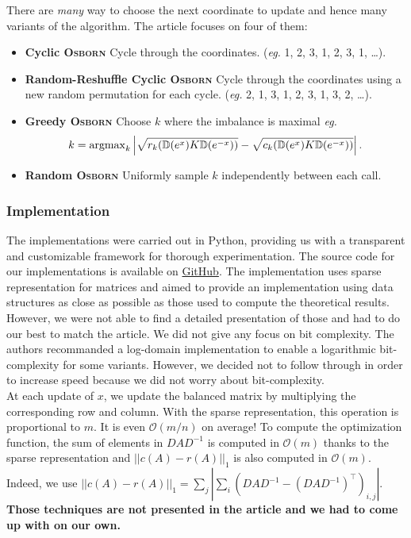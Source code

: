 There are \textit{many} way to choose the next coordinate to update and hence many variants of the algorithm. The article focuses on four of them:
\begin{itemize}
    \item \textbf{Cyclic \textsc{Osborn}} Cycle through the coordinates. (\textit{eg.} {\color{magenta}1, 2, 3}, {\color{cyan}1, 2, 3}, {\color{red}1,} \dots).
    \item \textbf{Random-Reshuffle Cyclic \textsc{Osborn}} Cycle through the coordinates using a new random permutation for each cycle. (\textit{eg.} {\color{magenta}2, 1, 3}, {\color{cyan}1, 2, 3}, {\color{red}1, 3, 2}, \dots).
    \item \textbf{Greedy \textsc{Osborn}} Choose \(k\) where the imbalance is maximal \textit{eg.}
    \[
        k = \operatorname{argmax}_{k}\left|\sqrt{r_k(\mathbb{D}(e^x) K \mathbb{D}(e^{-x}))} - \sqrt{c_k(\mathbb{D}(e^x) K \mathbb{D}(e^{-x}))}\right|.    
    \]
    \item \textbf{Random \textsc{Osborn}} Uniformly sample \(k\) independently between each call.
\end{itemize}

\subsubsection{Implementation}

The implementations were carried out in Python, providing us with a transparent and customizable framework for thorough experimentation. The source code for our implementations is available on \href{https://github.com/alexicanesse/Near-linear-convergence-of-the-Random-Osborne-algorithm-for-Matrix-Balancing}{GitHub}. The implementation uses sparse representation for matrices and aimed to provide an implementation using data structures as close as possible as those used to compute the theoretical results. However, we were not able to find a detailed presentation of those and had to do our best to match the article. We did not give any focus on bit complexity. The authors recommanded a log-domain implementation to enable a logarithmic bit-complexity for some variants. However, we decided not to follow through in order to increase speed because we did not worry about bit-complexity.\\

At each update of \(x\), we update the balanced matrix by multiplying the corresponding row and column. With the sparse representation, this operation is proportional to \(m\). It is even \(\mathcal O(m/n)\) on average! To compute the optimization function, the sum of elements in \(DAD^{-1}\) is computed in \(\mathcal O (m)\) thanks to the sparse representation and \(||c(A) - r(A)||_1\) is also computed in \(\mathcal O(m)\). Indeed, we use \(||c(A) - r(A)||_1 = \sum_j \left| \sum_i (DAD^{-1} - (DAD^{-1})^\top)_{i,j}\right|\). \textbf{Those techniques are not presented in the article and we had to come up with on our own.}\\

